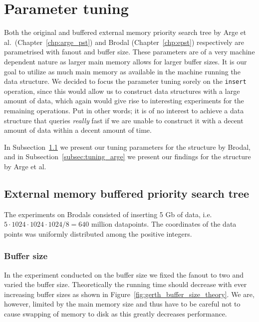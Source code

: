 \documentclass[twoside,11pt,openright]{report}
\begin{document}
\section{Parameter tuning}
Both the original and buffered external memory priority search tree by Arge et al.~(Chapter~\ref{chp:arge_pst}) and Brodal (Chapter~\ref{chp:epst}) respectively are parametrised with fanout and buffer size. These parameters are of a very machine dependent nature as larger main memory allows for larger buffer sizes. It is our goal to utilize as much main memory as available in the machine running the data structure. We decided to focus the parameter tuning sorely on the \texttt{insert} operation, since this would allow us to construct data structures with a large amount of data, which again would give rise to interesting experiments for the remaining operations. Put in other words; it is of no interest to achieve a data structure that queries \textit{really} fast if we are unable to construct it with a decent amount of data within a decent amount of time.

In Subsection~\ref{subsec:tuning_gerth} we present our tuning parameters for the structure by Brodal, and in Subsection~\ref{subsec:tuning_arge} we present our findings for the structure by Arge et al.

\subsection{External memory buffered priority search tree}
\label{subsec:tuning_gerth}
The experiments on Brodals consisted of inserting 5 Gb of data, i.e. $5 \cdot 1024 \cdot 1024 \cdot 1024 / 8 = 640$ million datapoints. The coordinates of the data points was uniformly distributed among the positive integers. 

\subsubsection*{Buffer size}

In the experiment conducted on the buffer size we fixed the fanout to two and varied the buffer size. Theoretically the running time should decrease with ever increasing buffer sizes as shown in Figure~\ref{fig:gerth_buffer_size_theory}. We are, however, limited by the main memory size and thus have to be careful not to cause swapping of memory to disk as this greatly decreases performance. 
\end{document}
